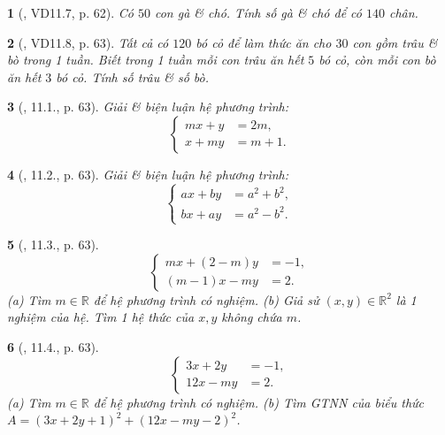 \documentclass{article}
\newtheorem{baitoan}{}
\begin{document}
\begin{baitoan}[\cite{TLCT_THCS_Toan_9_dai_so}, VD11.7, p. 62]
	Có $50$ con gà \& chó. Tính số gà \& chó để có $140$ chân.
\end{baitoan}

\begin{baitoan}[\cite{TLCT_THCS_Toan_9_dai_so}, VD11.8, p. 63]
	Tất cả có $120$ bó cỏ để làm thức ăn cho $30$ con gồm trâu \& bò trong 1 tuần. Biết trong 1 tuần mỗi con trâu ăn hết $5$ bó cỏ, còn mỗi con bò ăn hết $3$ bó cỏ. Tính số trâu \& số bò.
\end{baitoan}

\begin{baitoan}[\cite{TLCT_THCS_Toan_9_dai_so}, 11.1., p. 63]
	Giải \& biện luận hệ phương trình:
	\begin{equation*}
		\left\{\begin{split}
			mx + y &= 2m,\\
			x + my &= m + 1.
		\end{split}\right.
	\end{equation*}
\end{baitoan}

\begin{baitoan}[\cite{TLCT_THCS_Toan_9_dai_so}, 11.2., p. 63]
	Giải \& biện luận hệ phương trình:
	\begin{equation*}
		\left\{\begin{split}
			ax + by &= a^2 + b^2,\\
			bx + ay &= a^2 - b^2.
		\end{split}\right.
	\end{equation*}
\end{baitoan}

\begin{baitoan}[\cite{TLCT_THCS_Toan_9_dai_so}, 11.3., p. 63]
	\begin{equation*}
		\left\{\begin{split}
			mx + (2 - m)y &= -1,\\
			(m - 1)x - my &= 2.
		\end{split}\right.
	\end{equation*}
	(a) Tìm $m\in\mathbb{R}$ để hệ phương trình có nghiệm. (b) Giả sử $(x,y)\in\mathbb{R}^2$ là 1 nghiệm của hệ. Tìm 1 hệ thức của $x,y$ không chứa $m$.
\end{baitoan}

\begin{baitoan}[\cite{TLCT_THCS_Toan_9_dai_so}, 11.4., p. 63]
	\begin{equation*}
		\left\{\begin{split}
			3x + 2y &= -1,\\
			12x - my &= 2.
		\end{split}\right.
	\end{equation*}
	(a) Tìm $m\in\mathbb{R}$ để hệ phương trình có nghiệm. (b) Tìm {\rm GTNN} của biểu thức $A = (3x + 2y + 1)^2 + (12x - my - 2)^2$.
\end{baitoan}
\end{document}
